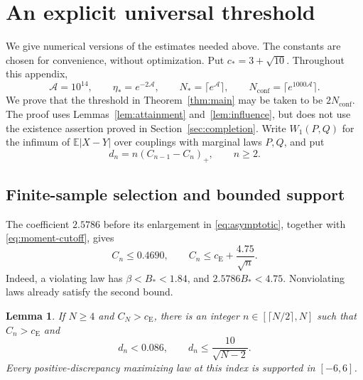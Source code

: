 \documentclass[aop]{imsart}
\theoremstyle{plain}
\newtheorem{lemma}[theorem]{Lemma}
\theoremstyle{definition}
\theoremstyle{definition}
\newcommand{\EE}{\mathbb E}
\newcommand{\ce}{c_{\mathrm E}}
\begin{document}
\newpage

\appendix
\section{An explicit universal threshold}\label{app:effective}

We give numerical versions of the estimates needed above.  The constants
are chosen for convenience, without optimization.  Put $c_*=3+\sqrt{10}$.
Throughout this appendix,
\[
 \mathcal A=10^{14},\qquad
 \eta_*=e^{-2\mathcal A},\qquad
 N_*=\lceil e^{\mathcal A}\rceil,\qquad
 N_{\mathrm{conf}}=\lceil e^{1000\mathcal A}\rceil.
\]
We prove that the threshold in Theorem~\ref{thm:main} may be taken to be
$2N_{\mathrm{conf}}$.  The proof uses Lemmas~\ref{lem:attainment}
and~\ref{lem:influence}, but does not use the existence assertion proved in
Section~\ref{sec:completion}.  Write $W_1(P,Q)$ for the infimum of
$\EE|X-Y|$ over couplings with marginal laws $P,Q$, and put
\[
 d_n=n(C_{n-1}-C_n)_+,\qquad n\ge2.
\]

\subsection{Finite-sample selection and bounded support}

The coefficient $2.5786$ before its enlargement in
\eqref{eq:asymptotic}, together with \eqref{eq:moment-cutoff}, gives
\begin{equation}\label{eq:effective-cn}
 C_n\le0.4690,\qquad C_n\le\ce+\frac{4.75}{\sqrt n}.
\end{equation}
Indeed, a violating law has $\beta<B_*<1.84$, and
$2.5786B_*<4.75$.  Nonviolating laws already satisfy the second bound.

\begin{lemma}\label{lem:effective-selection}
If $N\ge4$ and $C_N>\ce$, there is an integer
$n\in[\lceil N/2\rceil,N]$ such that $C_n>\ce$ and
\[
 d_n<0.086,\qquad d_n\le\frac{10}{\sqrt{N-2}}.
\]
Every positive-discrepancy maximizing law at this index is supported
in $[-6,6]$.
\end{lemma}
\end{document}
